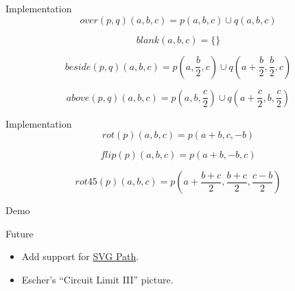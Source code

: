 \documentclass{beamer}
\begin{document}
    \begin{frame}{Implementation}
        \begin{equation*}
        over(p, q)(a, b, c) = p(a, b, c) \cup q(a, b, c)
        \end{equation*}

        \begin{equation*}
        blank(a, b, c) = \text{\{\}}
        \end{equation*}

        \begin{equation*}
        beside(p, q)(a, b, c) = p(a, \frac{b}{2}, c) \cup q(a + \frac{b}{2}, \frac{b}{2}, c)
        \end{equation*}

        \begin{equation*}
        above(p, q)(a, b, c) = p(a, b, \frac{c}{2}) \cup q (a + \frac{c}{2}, b, \frac{c}{2})
        \end{equation*}
    \end{frame}

    \begin{frame}{Implementation}
        \begin{equation*}
        rot(p)(a, b, c) = p(a + b, c, -b)
        \end{equation*}

        \begin{equation*}
        flip(p)(a, b, c) = p(a + b, -b, c)
        \end{equation*}

        \begin{equation*}
        rot45(p)(a, b, c) = p(a + \frac{b + c}{2}, \frac{b + c}{2}, \frac{c - b}{2})
        \end{equation*}
    \end{frame}

    \begin{frame}[standout]
        Demo
    \end{frame}

    \begin{frame}{Future}
        \begin{itemize}
            \item Add support for \href{https://developer.mozilla.org/en/docs/Web/SVG/Tutorial/Paths}{SVG Path}.
            \item Escher's ``Circuit Limit III'' picture.
        \end{itemize}

    \end{frame}
\end{document}
